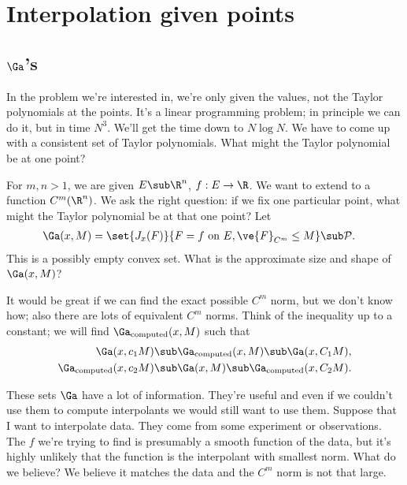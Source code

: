 
\section{Interpolation given points}

\subsection{$\Ga$'s}

In the problem we're interested in, we're only given the values, not the Taylor polynomials at the points. It's a linear programming problem; in principle we can do it, but in time $N^3$. We'll get the time down to $N\log N$. We have to come up with a consistent set of Taylor polynomials. What might the Taylor polynomial be at one point?

For $m,n>1$, we are given $E\sub \R^n$, $f:E\to \R$. We want to extend to a function $C^m(\R^n)$. 
We ask the right question: if we fix one particular point, what might the Taylor polynomial be at that one point?
Let 
\begin{align}
\Ga(x,M) &= \set{J_x(F)}{F=f\text{ on }E, \ve{F}_{C^m}\le M}\sub \cal P.
\end{align}
This is a possibly empty convex set.
What is the approximate size and shape of $\Ga(x,M)$? 

It would be great if we can find the exact possible $C^m$ norm, but we don't know how; also there are lots of equivalent $C^m$ norms. Think of the inequality up to a constant; we will find $\Ga_{\text{computed}}(x,M)$ such that
\begin{align}
\Ga(x,c_1M)&\sub
\Ga_{\text{computed}}(x,M) \sub \Ga (x,C_1M),\\
\Ga_{\text{computed}}(x,c_2M)& \sub \Ga(x,M)\sub \Ga_{\text{computed}}(x,C_2M).
\end{align}

These sets $\Ga$ have a lot of information. They're useful and even if we couldn't use them to compute interpolants we would still want to use them.
Suppose that I want to interpolate data. They come from some experiment or observations. The $f$ we're trying to find is presumably a smooth function of the data, but it's highly unlikely that the function is the interpolant with smallest norm. What do we believe? We believe it matches the data and the $C^m$ norm is not that large. 


